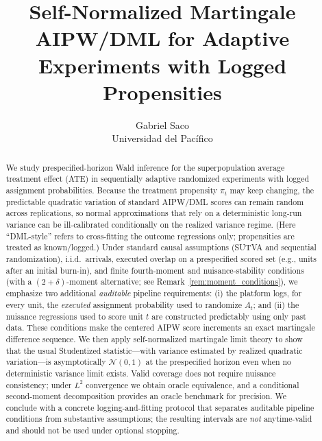 \documentclass[11pt]{article}
\numberwithin{equation}{section}
\theoremstyle{plain}
\theoremstyle{definition}
\theoremstyle{remark}
\begin{document}
\title{Self-Normalized Martingale AIPW/DML for Adaptive Experiments with Logged Propensities}
\author{Gabriel Saco \\ \small Universidad del Pac\'ifico}
\date{}
\maketitle
\thispagestyle{plain}
\vspace{-0.5em}

\begin{abstract}
We study prespecified-horizon Wald inference for the superpopulation average treatment effect (ATE) in sequentially adaptive randomized experiments with logged assignment probabilities. Because the treatment propensity $\pi_t$ may keep changing, the predictable quadratic variation of standard AIPW/DML scores can remain random across replications, so normal approximations that rely on a deterministic long-run variance can be ill-calibrated conditionally on the realized variance regime. (Here ``DML-style'' refers to cross-fitting the outcome regressions only; propensities are treated as known/logged.) Under standard causal assumptions (SUTVA and sequential randomization), i.i.d.\ arrivals, executed overlap on a prespecified scored set (e.g., units after an initial burn-in), and finite fourth-moment and nuisance-stability conditions (with a $(2+\delta)$-moment alternative; see Remark~\ref{rem:moment_conditions}), we emphasize two additional \emph{auditable} pipeline requirements: (i) the platform logs, for every unit, the \emph{executed} assignment probability used to randomize $A_t$; and (ii) the nuisance regressions used to score unit $t$ are constructed predictably using only past data. These conditions make the centered AIPW score increments an exact martingale difference sequence. We then apply self-normalized martingale limit theory to show that the usual Studentized statistic---with variance estimated by realized quadratic variation---is asymptotically $\mathcal{N}(0,1)$ at the prespecified horizon even when no deterministic variance limit exists. Valid coverage does not require nuisance consistency; under $L^2$ convergence we obtain oracle equivalence, and a conditional second-moment decomposition provides an oracle benchmark for precision. We conclude with a concrete logging-and-fitting protocol that separates auditable pipeline conditions from substantive assumptions; the resulting intervals are \emph{not} anytime-valid and should not be used under optional stopping.
\end{abstract}
\end{document}
